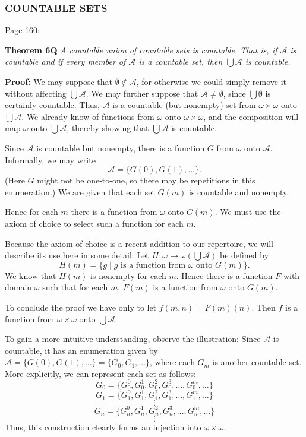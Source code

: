 \subsubsection{COUNTABLE SETS}
Page 160:
\begin{leftbar}
    \textbf{Theorem 6Q} \textit{A countable union of countable sets is countable. That is, if \(\mathcal{A}\) is countable and if every member of \(\mathcal{A}\) is a countable set, then \(\bigcup \mathcal{A}\) is countable.}

    \textbf{Proof:} We may suppose that \(\emptyset \notin \mathcal{A}\), for otherwise we could simply remove it without affecting \(\bigcup \mathcal{A}\). We may further suppose that \(\mathcal{A} \neq \emptyset\), since \(\bigcup \emptyset\) is certainly countable. Thus, \(\mathcal{A}\) is a countable (but nonempty) set from \(\omega \times \omega\) onto \(\bigcup \mathcal{A}\). We already know of functions from \(\omega\) onto \(\omega \times \omega\), and the composition will map \(\omega\) onto \(\bigcup \mathcal{A}\), thereby showing that \(\bigcup \mathcal{A}\) is countable.

    Since \(\mathcal{A}\) is countable but nonempty, there is a function \(G\) from \(\omega\) onto \(\mathcal{A}\). Informally, we may write
    \[
    \mathcal{A} = \{G(0), G(1), \ldots\}.
    \]
    (Here \(G\) might not be one-to-one, so there may be repetitions in this enumeration.) We are given that each set \(G(m)\) is countable and nonempty.

    Hence for each \(m\) there is a function from \(\omega\) onto \(G(m)\). We must use the axiom of choice to select such a function for each \(m\).

    Because the axiom of choice is a recent addition to our repertoire, we will describe its use here in some detail. Let \(H: \omega \to \omega(\bigcup \mathcal{A})\) be defined by
    \[
    H(m) = \{g \mid g \text{ is a function from } \omega \text{ onto } G(m)\}.
    \]
    We know that \(H(m)\) is nonempty for each \(m\). Hence there is a function \(F\) with domain \(\omega\) such that for each \(m\), \(F(m)\) is a function from \(\omega\) onto \(G(m)\).

    To conclude the proof we have only to let \(f(m, n) = F(m)(n)\). Then \(f\) is a function from \(\omega \times \omega\) onto \(\bigcup \mathcal{A}\).

\end{leftbar}

To gain a more intuitive understanding, observe the illustration: Since \(\mathcal{A}\) is countable, it has an enumeration given by \(\mathcal{A} = \{G(0), G(1), \ldots\} = \{G_0, G_1, \ldots\}\), where each \(G_m\) is another countable set. More explicitly, we can represent each set as follows:
\[
G_0 = \{G_0^0, G_0^1, G_0^2, G_0^3, \ldots, G_0^m, \ldots\}
\]
\[
G_1 = \{G_1^0, G_1^1, G_1^2, G_1^3, \ldots, G_1^m, \ldots\}
\]
\[
\vdots
\]
\[
G_n = \{G_n^0, G_n^1, G_n^2, G_n^3, \ldots, G_n^m, \ldots\}
\]
\[
\vdots
\]
Thus, this construction clearly forms an injection into \(\omega \times \omega\).
